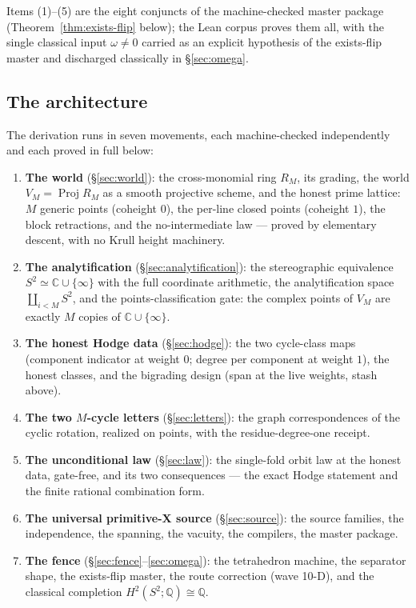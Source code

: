 \documentclass[11pt,a4paper]{article}
\theoremstyle{plain}
\theoremstyle{definition}
\newcommand{\Q}{\mathbb{Q}}
\newcommand{\C}{\mathbb{C}}
\newcommand{\Proj}{\operatorname{Proj}}
\begin{document}
Items (1)--(5) are the eight conjuncts of the machine-checked master
package (Theorem~\ref{thm:exists-flip} below); the Lean corpus proves
them all, with the single classical input $\omega \ne 0$ carried as an
explicit hypothesis of the exists-flip master and discharged classically
in \S\ref{sec:omega}.

\subsection{The architecture}

The derivation runs in seven movements, each machine-checked
independently and each proved in full below:

\begin{enumerate}
\item \textbf{The world} (\S\ref{sec:world}): the cross-monomial ring
$R_M$, its grading, the world $V_M = \Proj R_M$ as a smooth projective
scheme, and the honest prime lattice: $M$ generic points (coheight $0$),
the per-line closed points (coheight $1$), the block retractions, and
the no-intermediate law --- proved by elementary descent, with no Krull
height machinery.
\item \textbf{The analytification} (\S\ref{sec:analytification}): the
stereographic equivalence $S^2 \simeq \C \cup \{\infty\}$ with the full
coordinate arithmetic, the analytification space $\coprod_{i<M} S^2$, and
the points-classification gate: the complex points of $V_M$ are exactly
$M$ copies of $\C \cup \{\infty\}$.
\item \textbf{The honest Hodge data} (\S\ref{sec:hodge}): the two
cycle-class maps (component indicator at weight $0$; degree per
component at weight $1$), the honest classes, and the bigrading design
(span at the live weights, stash above).
\item \textbf{The two $M$-cycle letters} (\S\ref{sec:letters}): the
graph correspondences of the cyclic rotation, realized on points, with
the residue-degree-one receipt.
\item \textbf{The unconditional law} (\S\ref{sec:law}): the single-fold
orbit law at the honest data, gate-free, and its two consequences ---
the exact Hodge statement and the finite rational combination form.
\item \textbf{The universal primitive-X source}
(\S\ref{sec:source}): the source families, the independence, the
spanning, the vacuity, the compilers, the master package.
\item \textbf{The fence} (\S\ref{sec:fence}--\ref{sec:omega}): the
tetrahedron machine, the separator shape, the exists-flip master, the
route correction (wave 10-D), and the classical completion
$H^2(S^2;\Q) \cong \Q$.
\end{enumerate}
\end{document}
